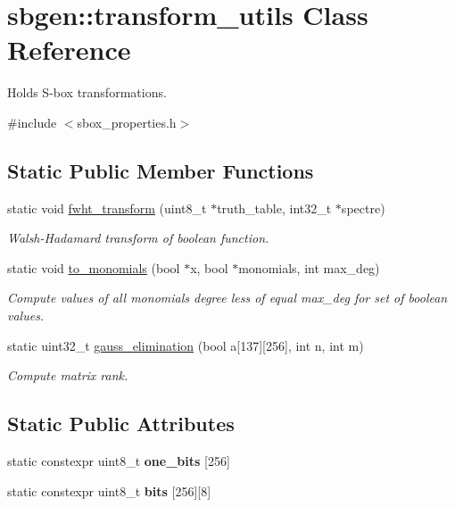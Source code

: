 \hypertarget{classsbgen_1_1transform__utils}{}\section{sbgen\+:\+:transform\+\_\+utils Class Reference}
\label{classsbgen_1_1transform__utils}


Holds S-\/box transformations.  




{\ttfamily \#include $<$sbox\+\_\+properties.\+h$>$}

\subsection*{Static Public Member Functions}
\begin{DoxyCompactItemize}
\item 
static void \hyperlink{classsbgen_1_1transform__utils_a764bf170fd2350216aff391a7387580c}{fwht\+\_\+transform} (uint8\+\_\+t $\ast$truth\+\_\+table, int32\+\_\+t $\ast$spectre)
\begin{DoxyCompactList}\small\item\em Walsh-\/\+Hadamard transform of boolean function. \end{DoxyCompactList}\item 
static void \hyperlink{classsbgen_1_1transform__utils_a362b5d7c691ec86d80ef57e8455bbbc3}{to\+\_\+monomials} (bool $\ast$x, bool $\ast$monomials, int max\+\_\+deg)
\begin{DoxyCompactList}\small\item\em Compute values of all monomials degree less of equal max\+\_\+deg for set of boolean values. \end{DoxyCompactList}\item 
static uint32\+\_\+t \hyperlink{classsbgen_1_1transform__utils_a4a2636f84e59ec0dff2418233d9ec79f}{gauss\+\_\+elimination} (bool a\mbox{[}137\mbox{]}\mbox{[}256\mbox{]}, int n, int m)
\begin{DoxyCompactList}\small\item\em Compute matrix rank. \end{DoxyCompactList}\end{DoxyCompactItemize}
\subsection*{Static Public Attributes}
\begin{DoxyCompactItemize}
\item 
static constexpr uint8\+\_\+t {\bfseries one\+\_\+bits} \mbox{[}256\mbox{]}
\item 
\mbox{\label{classsbgen_1_1transform__utils_ad80ea2b09628c790ea56154fbcd5f31b}} 
static constexpr uint8\+\_\+t {\bfseries bits} \mbox{[}256\mbox{]}\mbox{[}8\mbox{]}
\end{DoxyCompactItemize}


